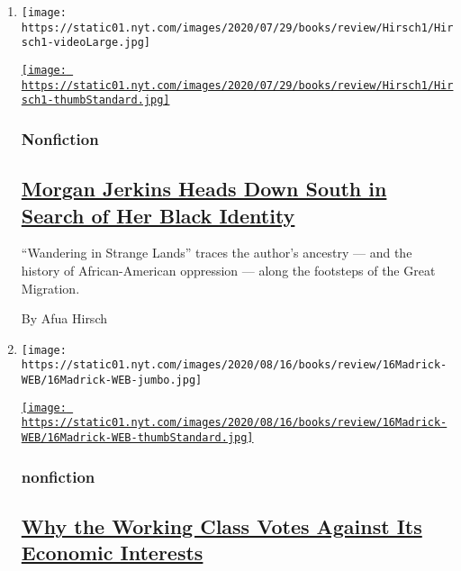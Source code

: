 \begin{enumerate}
\def\labelenumi{\arabic{enumi}.}
\item
  \texttt{[image: https://static01.nyt.com/images/2020/07/29/books/review/Hirsch1/Hirsch1-videoLarge.jpg]}

  \href{/2020/08/03/books/review/wandering-in-strange-lands-morgan-jerkins.html}{\texttt{[image: https://static01.nyt.com/images/2020/07/29/books/review/Hirsch1/Hirsch1-thumbStandard.jpg]}}

  \hypertarget{nonfiction}{%
  \subsubsection{Nonfiction}\label{nonfiction}}

  \hypertarget{morgan-jerkins-heads-down-south-in-search-of-her-black-identity}{%
  \subsection{\texorpdfstring{\href{/2020/08/03/books/review/wandering-in-strange-lands-morgan-jerkins.html}{Morgan
  Jerkins Heads Down South in Search of Her Black
  Identity}}{Morgan Jerkins Heads Down South in Search of Her Black Identity}}\label{morgan-jerkins-heads-down-south-in-search-of-her-black-identity}}

  ``Wandering in Strange Lands'' traces the author's ancestry --- and
  the history of African-American oppression --- along the footsteps of
  the Great Migration.

  By Afua Hirsch
\item
  \texttt{[image: https://static01.nyt.com/images/2020/08/16/books/review/16Madrick-WEB/16Madrick-WEB-jumbo.jpg]}

  \href{/2020/07/31/books/review/the-system-robert-reich-break-em-up-zephyr-teachout.html}{\texttt{[image: https://static01.nyt.com/images/2020/08/16/books/review/16Madrick-WEB/16Madrick-WEB-thumbStandard.jpg]}}

  \hypertarget{nonfiction-1}{%
  \subsubsection{nonfiction}\label{nonfiction-1}}

  \hypertarget{why-the-working-class-votes-against-its-economic-interests}{%
  \subsection{\texorpdfstring{\href{/2020/07/31/books/review/the-system-robert-reich-break-em-up-zephyr-teachout.html}{Why
  the Working Class Votes Against Its Economic
  Interests}}{Why the Working Class Votes Against Its Economic Interests}}\label{why-the-working-class-votes-against-its-economic-interests}}


\end{enumerate}
